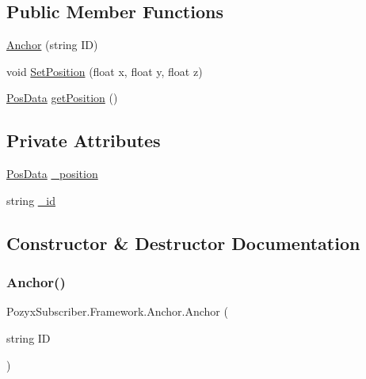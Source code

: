 \subsection*{Public Member Functions}
\begin{DoxyCompactItemize}
\item 
\hyperlink{class_pozyx_subscriber_1_1_framework_1_1_anchor_af3383b1c654f08e99fd5fd42a522b1b7}{Anchor} (string ID)
\item 
void \hyperlink{class_pozyx_subscriber_1_1_framework_1_1_anchor_a7a7f74dc8d89d8ec6bbd5f155fce5850}{Set\+Position} (float x, float y, float z)
\item 
\hyperlink{struct_pozyx_subscriber_1_1_framework_1_1_pos_data}{Pos\+Data} \hyperlink{class_pozyx_subscriber_1_1_framework_1_1_anchor_aa62fb67e660b0a83467bca1e8a523607}{get\+Position} ()
\end{DoxyCompactItemize}
\subsection*{Private Attributes}
\begin{DoxyCompactItemize}
\item 
\hyperlink{struct_pozyx_subscriber_1_1_framework_1_1_pos_data}{Pos\+Data} \hyperlink{class_pozyx_subscriber_1_1_framework_1_1_anchor_ac316ecc8136e9a3081a847c41854e67a}{\+\_\+position}
\item 
string \hyperlink{class_pozyx_subscriber_1_1_framework_1_1_anchor_a2bd63c7b8f0f8d466e6e4da6a1d89cab}{\+\_\+id}
\end{DoxyCompactItemize}


\subsection{Constructor \& Destructor Documentation}
\mbox{\label{class_pozyx_subscriber_1_1_framework_1_1_anchor_af3383b1c654f08e99fd5fd42a522b1b7}} 
\subsubsection{\texorpdfstring{Anchor()}{Anchor()}}
{\footnotesize\ttfamily Pozyx\+Subscriber.\+Framework.\+Anchor.\+Anchor (\begin{DoxyParamCaption}\item[{string}]{ID }\end{DoxyParamCaption})}



